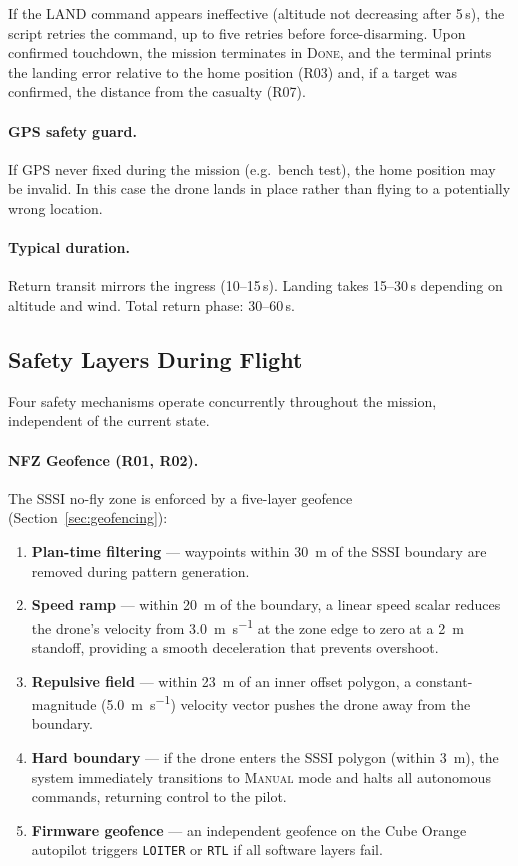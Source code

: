 \noindent If the LAND command appears ineffective (altitude not decreasing after 5\,s), the script retries the command, up to five retries before force-disarming.  Upon confirmed touchdown, the mission terminates in \textsc{Done}, and the terminal prints the landing error relative to the home position (R03) and, if a target was confirmed, the distance from the casualty (R07).

\paragraph{GPS safety guard.}  If GPS never fixed during the mission (e.g.\ bench test), the home position may be invalid.  In this case the drone lands in place rather than flying to a potentially wrong location.

\paragraph{Typical duration.}  Return transit mirrors the ingress (10--15\,s).  Landing takes 15--30\,s depending on altitude and wind.  Total return phase: 30--60\,s.

\subsection{Safety Layers During Flight}\label{sec:mf-safety}

Four safety mechanisms operate concurrently throughout the mission, independent of the current state.

\paragraph{NFZ Geofence (R01, R02).}\label{sec:mf-nfz}
The SSSI no-fly zone is enforced by a five-layer geofence (Section~\ref{sec:geofencing}):

\begin{enumerate}
  \item \textbf{Plan-time filtering} --- waypoints within \SI{30}{\metre} of the SSSI boundary are removed during pattern generation.
  \item \textbf{Speed ramp} --- within \SI{20}{\metre} of the boundary, a linear speed scalar reduces the drone's velocity from \SI{3.0}{\metre\per\second} at the zone edge to zero at a \SI{2}{\metre} standoff, providing a smooth deceleration that prevents overshoot.
  \item \textbf{Repulsive field} --- within \SI{23}{\metre} of an inner offset polygon, a constant-magnitude (\SI{5.0}{\metre\per\second}) velocity vector pushes the drone away from the boundary.
  \item \textbf{Hard boundary} --- if the drone enters the SSSI polygon (within \SI{3}{\metre}), the system immediately transitions to \textsc{Manual} mode and halts all autonomous commands, returning control to the pilot.
  \item \textbf{Firmware geofence} --- an independent geofence on the Cube Orange autopilot triggers \texttt{LOITER} or \texttt{RTL} if all software layers fail.
\end{enumerate}

